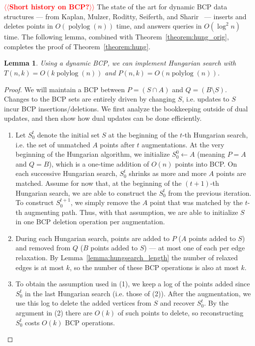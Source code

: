 \documentclass[11pt]{article}
\makeatletter
\def\polylog{\mathop{\mathrm{polylog}}}
\theoremstyle{plain}
\newtheorem{lemma}{Lemma}
\def\n@te#1{\textsf{\boldmath \textbf{$\langle\!\langle$#1$\rangle\!\rangle$}}\leavevmode}
\def\note#1{\textcolor{red}{\n@te{#1}}}
\makeatother
\begin{document}
\begin{figure*}
\note{Short history on BCP?}
The state of the art for dynamic BCP data structures --- from Kaplan, Mulzer,
Roditty, Seiferth, and Sharir~\cite{KMRSS17} --- inserts and deletes points in
$O(\polylog(n))$ time, and answers queries in $O(\log^2 n)$ time.
The following lemma, combined with Theorem~\ref{theorem:hung_orig}, completes
the proof of Theorem~\ref{theorem:hung}.

\begin{lemma}
\label{lemma:hs_time}
Using a dynamic BCP, we can implement Hungarian search with
$T(n, k) = O(k\polylog(n))$ and $P(n, k) = O(n\polylog(n))$.
\end{lemma}

\begin{proof}
We will maintain a BCP between $P = (S \cap A)$ and $Q = (B \setminus S)$.
Changes to the BCP sets are entirely driven by changing $S$, i.e. updates to
$S$ incur BCP insertions/deletions.
We first analyze the bookkeeping outside of dual updates, and then show how
dual updates can be done efficiently.

\begin{enumerate}
\item Let $S^t_0$ denote the initial set $S$ at the beginning of the
	$t$-th Hungarian search, i.e. the set of unmatched $A$ points
	after $t$ augmentations.
	At the very beginning of the Hungarian algorithm, we initialize
	$S^0_0 \gets A$ (meaning $P = A$ and $Q = B$), which is a
	one-time addition of $O(n)$ points into BCP.
	On each successive Hungarian search, $S^t_0$ shrinks as more
	and more $A$ points are matched.
	Assume for now that, at the beginning of the $(t+1)$-th
	Hungarian search, we are able to construct the $S^t_0$ from the
	previous iteration.
	To construct $S^{t+1}_0$, we simply remove the $A$ point that
	was matched by the $t$-th augmenting path.
	Thus, with that assumption, we are able to initialize $S$ in
	one BCP deletion operation per augmentation.

\item During each Hungarian search, points are added to $P$ ($A$ points
	added to $S$) and removed from $Q$ ($B$ points added to $S$)
	--- at most one of each per edge relaxation.
	By Lemma~\ref{lemma:hungsearch_length} the number of relaxed
	edges is at most $k$, so the number of these BCP operations is
	also at most $k$.

\item To obtain the assumption used in (1), we keep a log of the
	points added since $S^t_0$ in the last Hungarian search
	(i.e. those of (2)).
	After the augmentation, we use this log to delete the added
	vertices from $S$ and recover $S^t_0$.
	By the argument in (2) there are $O(k)$ of such points to
	delete, so reconstructing $S^t_0$ costs $O(k)$ BCP operations.
\end{enumerate}


\end{proof}
\end{figure*}
\end{document}
